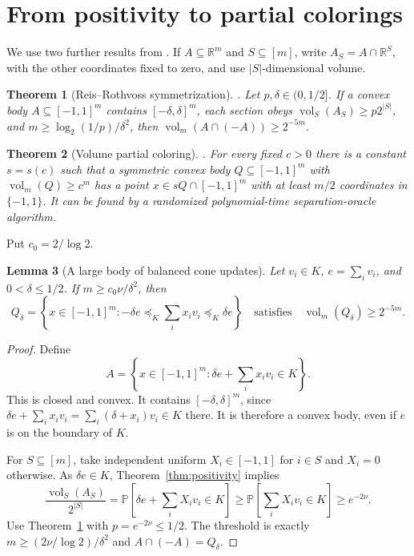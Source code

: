 \documentclass[11pt]{article}
\newtheorem{theorem}{Theorem}[section]
\newtheorem{lemma}[theorem]{Lemma}
\newcommand{\R}{\mathbb R}
\newcommand{\Prb}{\mathbb P}
\newcommand{\vol}{\operatorname{vol}}
\begin{document}
\section{From positivity to partial colorings}

We use two further results from \cite{RR26}. If $A\subseteq\R^m$ and
$S\subseteq[m]$, write $A_S=A\cap\R^S$, with the other coordinates
fixed to zero, and use $|S|$-dimensional volume.

\begin{theorem}[Reis--Rothvoss symmetrization]\label{thm:rrsym}
\cite[Theorem~22]{RR26}.
Let $p,\delta\in(0,1/2]$. If a convex body $A\subseteq[-1,1]^m$
contains $[-\delta,\delta]^m$, each section obeys
$\vol_S(A_S)\ge p2^{|S|}$, and
$m\ge\log_2(1/p)/\delta^2$, then
$\vol_m(A\cap(-A))\ge2^{-5m}$.
\end{theorem}

\begin{theorem}[Volume partial coloring]\label{thm:rrpartial}
\cite[Theorem~7]{RR26}.
For every fixed $c>0$ there is a constant $s=s(c)$ such that a
symmetric convex body $Q\subseteq[-1,1]^m$ with
$\vol_m(Q)\ge c^m$ has a point
$x\in sQ\cap[-1,1]^m$ with at least $m/2$ coordinates in $\{-1,1\}$.
It can be found by a randomized polynomial-time separation-oracle
algorithm.
\end{theorem}

Put $c_0=2/\log 2$.

\begin{lemma}[A large body of balanced cone updates]\label{lem:volume}
Let $v_i\in K$, $e=\sum_i v_i$, and $0<\delta\le1/2$.
If $m\ge c_0\nu/\delta^2$, then
\begin{equation}\label{eq:Q}
 Q_\delta=
 \left\{x\in[-1,1]^m:
       -\delta e\preceq_K\sum_i x_i v_i\preceq_K\delta e\right\}
 \quad\text{satisfies}\quad
 \vol_m(Q_\delta)\ge2^{-5m}.
\end{equation}
\end{lemma}
\begin{proof}
Define
\[
 A=\left\{x\in[-1,1]^m:
           \delta e+\sum_i x_i v_i\in K\right\}.
\]
This is closed and convex. It contains $[-\delta,\delta]^m$, since
$\delta e+\sum_i x_i v_i=\sum_i(\delta+x_i)v_i\in K$ there.
It is therefore a convex body, even if $e$ is on the boundary of $K$.

For $S\subseteq[m]$, take independent uniform $X_i\in[-1,1]$ for
$i\in S$ and $X_i=0$ otherwise. As $\delta e\in K$,
Theorem~\ref{thm:positivity} implies
\[
 \frac{\vol_S(A_S)}{2^{|S|}}
 =\Prb\left[\delta e+\sum_iX_i v_i\in K\right]
 \ge\Prb\left[\sum_iX_i v_i\in K\right]
 \ge e^{-2\nu}.
\]
Use Theorem~\ref{thm:rrsym} with $p=e^{-2\nu}\le1/2$.
The threshold is exactly
$m\ge(2\nu/\log2)/\delta^2$ and $A\cap(-A)=Q_\delta$.
\end{proof}
\end{document}
